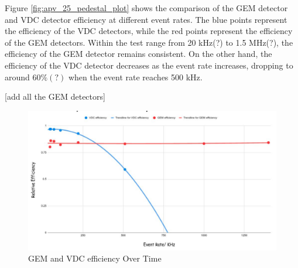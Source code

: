 Figure \ref{fig:apv_25_pedestal_plot} shows the comparison of the GEM detector and VDC detector  efficiency  at different event rates. The blue points represent the efficiency of the VDC detectors, while the red points represent the efficiency of the GEM detectors. Within the test range from 20 kHz(?) to 1.5 MHz(?), the efficiency of the GEM detector remains consistent. On the other hand, the efficiency of the VDC detector decreases as the event rate increases, dropping to around $60\%(?)$ when the event rate reaches 500 kHz. 
%
%

[add all the GEM detectors]



\begin{figure}[!htbp]
    \centering
    \includegraphics[width=\textwidth]{images/chap5/gem efficiency over time.png}
    \caption{GEM and VDC efficiency Over Time}
    \label{fig:gem_efficiency_over_time}
\end{figure}